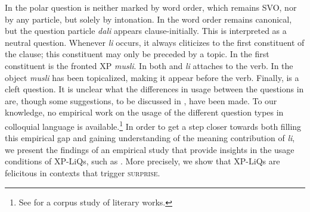 \documentclass[output=paper]{langscibook}
\begin{document}
\noindent
In  the polar question is neither marked by word order, which remains SVO, nor by any particle, but solely by intonation. In  the word order remains canonical, but the question particle \textit{dali} appears clause-initially. This is interpreted as a neutral question.
Whenever \textit{li} occurs, it always cliticizes to the first constituent of the clause; this constituent may only be preceded by a topic. In  the first constituent is the fronted XP \textit{musli}. In both  and  \textit{li} attaches to the verb. In  the object \textit{musli} has been topicalized, making it appear before the verb. Finally,  is a cleft question. It is unclear what the differences in usage between the questions in  are, though some suggestions, to be discussed in , have been made. To our knowledge, no empirical work on the usage of the different question types in colloquial language is available.\footnote{See \citet{englund1977} for a corpus study of literary works.} In order to get a step closer towards both filling this empirical gap and gaining understanding of the mea\-ning contribution of \textit{li}, we present the findings of an empirical study that provide insights in the usage conditions of XP-LiQs, such as . More precisely, we show that XP-LiQs are felicitous in contexts that trigger \textsc{surprise}.
\end{document}

